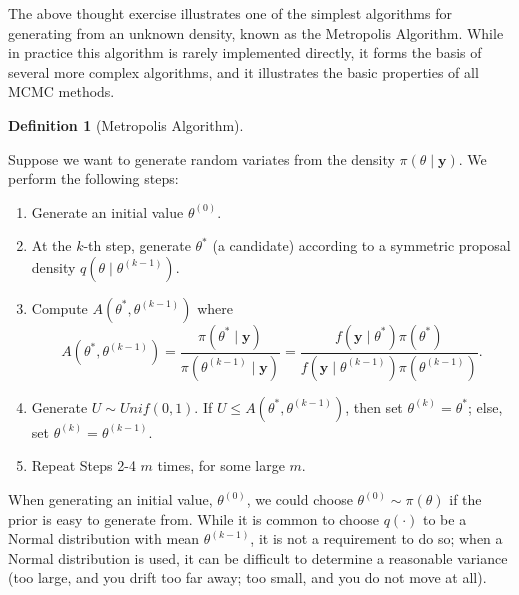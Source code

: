 \documentclass[
  letterpaper,
  DIV=11,
  numbers=noendperiod]{scrreprt}
\providecommand{\tightlist}{%
  \setlength{\itemsep}{0pt}\setlength{\parskip}{0pt}}\usepackage{longtable,booktabs,array}
\theoremstyle{definition}
\newtheorem{definition}{Definition}[chapter]
\theoremstyle{plain}
\theoremstyle{definition}
\theoremstyle{remark}
\begin{document}
The above thought exercise illustrates one of the simplest algorithms
for generating from an unknown density, known as the Metropolis
Algorithm. While in practice this algorithm is rarely implemented
directly, it forms the basis of several more complex algorithms, and it
illustrates the basic properties of all MCMC methods.

\begin{definition}[Metropolis
Algorithm]\protect\hypertarget{def-metropolis-algorithm}{}\label{def-metropolis-algorithm}

Suppose we want to generate random variates from the density
\(\pi(\theta \mid \mathbf{y})\). We perform the following steps:

\begin{enumerate}
\def\labelenumi{\arabic{enumi}.}
\tightlist
\item
  Generate an initial value \(\theta^{(0)}\).\\
\item
  At the \(k\)-th step, generate \(\theta^*\) (a candidate) according to
  a symmetric proposal density
  \(q\left(\theta \mid \theta^{(k-1)}\right)\).\\
\item
  Compute \(A\left(\theta^*, \theta^{(k-1)}\right)\) where
  \[A\left(\theta^*, \theta^{(k-1)}\right) = \frac{\pi\left(\theta^* \mid \mathbf{y}\right)}{\pi\left(\theta^{(k-1)} \mid \mathbf{y}\right)} = \frac{f\left(\mathbf{y} \mid \theta^*\right) \pi\left(\theta^*\right)}{f\left(\mathbf{y} \mid \theta^{(k-1)}\right) \pi\left(\theta^{(k-1)}\right)}.\]
\item
  Generate \(U \sim Unif(0,1)\). If
  \(U \leq A\left(\theta^*, \theta^{(k-1)}\right)\), then set
  \(\theta^{(k)} = \theta^*\); else, set
  \(\theta^{(k)} = \theta^{(k-1)}\).
\item
  Repeat Steps 2-4 \(m\) times, for some large \(m\).
\end{enumerate}

When generating an initial value, \(\theta^{(0)}\), we could choose
\(\theta^{(0)} \sim \pi(\theta)\) if the prior is easy to generate from.
While it is common to choose \(q(\cdot)\) to be a Normal distribution
with mean \(\theta^{(k-1)}\), it is not a requirement to do so; when a
Normal distribution is used, it can be difficult to determine a
reasonable variance (too large, and you drift too far away; too small,
and you do not move at all).

\end{definition}
\end{document}
